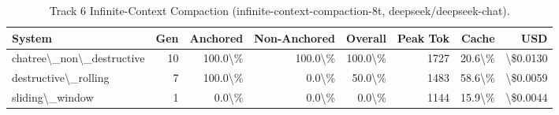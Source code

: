 \begin{table}[t]
\centering
\small
\begin{tabular}{lrrrrrrr}
\toprule
\textbf{System} & \textbf{Gen} & \textbf{Anchored} & \textbf{Non-Anchored} & \textbf{Overall} & \textbf{Peak Tok} & \textbf{Cache} & \textbf{USD} \\
\midrule
chatree\textbackslash{}\_non\textbackslash{}\_destructive & 10 & 100.0\textbackslash{}\% & 100.0\textbackslash{}\% & 100.0\textbackslash{}\% & 1727 & 20.6\textbackslash{}\% & \textbackslash{}\$0.0130 \\
destructive\textbackslash{}\_rolling & 7 & 100.0\textbackslash{}\% & 0.0\textbackslash{}\% & 50.0\textbackslash{}\% & 1483 & 58.6\textbackslash{}\% & \textbackslash{}\$0.0059 \\
sliding\textbackslash{}\_window & 1 & 0.0\textbackslash{}\% & 0.0\textbackslash{}\% & 0.0\textbackslash{}\% & 1144 & 15.9\textbackslash{}\% & \textbackslash{}\$0.0044 \\
\bottomrule
\end{tabular}
\caption{Track 6 Infinite-Context Compaction (infinite-context-compaction-8t, deepseek/deepseek-chat).}
\label{tab:compaction_track6}
\end{table}
